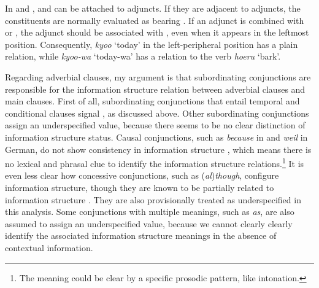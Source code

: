 In  and , \wa and \nun can be attached to
adjuncts. If they are adjacent to adjuncts, the constituents are
normally evaluated as bearing . If an adjunct is
combined with \wa or \nun, the adjunct should be associated with
, even when it appears in the leftmost
position. Consequently, \textit{kyoo} `today' in the left-peripheral
position has a plain  relation, while \textit{kyoo-wa}
`today-wa' has a  relation to the verb
\textit{hoeru} `bark'.







Regarding adverbial clauses, my argument is that
subordinating conjunctions are responsible for the information
structure relation between adverbial clauses and main
clauses. First of all, subordinating conjunctions
that entail temporal and conditional clauses signal 
\citep{haiman:78,ramsay:87}, as discussed above. Other subordinating
conjunctions assign an underspecified  value, because
there seems to be no clear distinction of information structure
status. Causal conjunctions, such as \textit{because} in  and
\textit{weil} in German, do not show consistency in information
structure \citep{heycock:07}, which means there is no lexical and
phrasal clue to identify the information structure
relations.\footnote{The meaning could be clear by a specific prosodic
  pattern, like intonation.}  It is even less clear how concessive
conjunctions, such as (\textit{al})\textit{though}, configure
information structure, though they are known to be partially related
to information structure \citep{chung:kim:09}.
They are also provisionally treated as underspecified in this analysis. Some
conjunctions with multiple meanings, such as \textit{as}, are also
assumed to assign an underspecified value, because we cannot clearly
clearly identify the associated information structure meanings in the
absence of contextual information.




